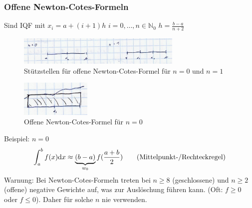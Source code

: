 \subsubsection{Offene Newton-Cotes-Formeln}
Sind IQF mit $x_i = a + (i+1)h$ $i=0,\ldots,n \in \mathbb{N}_0$
$h=\frac{b-a}{n+2}$
\begin{figure}[htbp]
  \centering
  \includegraphics[width=0.7\textwidth]{figures/o_ncf.png}
  \caption{Stützstellen für offene Newton-Cotes-Formel für $n=0$ und $n=1$}
\end{figure}
\begin{figure}[htbp]
  \centering
  \includegraphics[width=0.3\textwidth]{figures/bsp_o_ncf.png}
  \caption{Offene Newton-Cotes-Formel für $n=0$}
\end{figure}
Beispiel: $n=0$
\begin{align*}
  \int_a^b f(x) \mathrm{d}x \approx \underbrace{(b-a)}_{w_0} f(\frac{a+b}{2}) \tag{Mittelpunkt-/Rechteckregel}
\end{align*}
Warnung: Bei Newton-Cotes-Formeln treten bei $n \geq 8$ (geschlossene) und $n \geq 2$ (offene)
negative Gewichte auf, was zur Auslöschung führen kann. (Oft: $f \geq 0$ oder $f \leq 0$).
Daher für solche $n$ nie verwenden.


